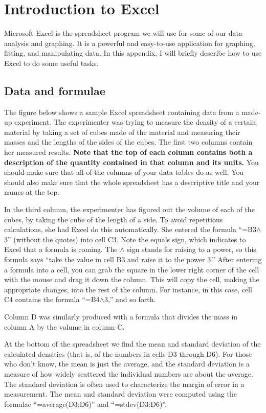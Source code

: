 \chapter{Introduction to Excel}

\bigskip\bigskip

Microsoft Excel is the spreadsheet program we will use for some of our
data analysis and graphing.  It is a powerful and easy-to-use
application for graphing, fitting, and manipulating data. In this
appendix, I will briefly describe how to use Excel to do some useful
tasks.  

\section{Data and formulae}

The figure below shows a sample Excel spreadsheet containing data
from a made-up experiment.  The experimenter was trying to measure
the density of a certain material by taking a set of cubes
made of the material and measuring their masses and the lengths of
the sides of the cubes.  The first two columns contain her measured
results.  \textbf{Note that the top of each column contains both
a description of the quantity contained in that column and its units.}
You should make sure that all of the columns of your data tables do as well.
You should also make sure that the whole spreadsheet has a descriptive
title and your names at the top.

In the third column, the experimenter has figured out the volume
of each of the cubes, by taking the cube of the length of a side.
To avoid repetitious calculations, she had Excel do this automatically.
She entered the formula ``=B3$\wedge$3'' (without the quotes) into cell C3.
Note the equals sign, which indicates to Excel that a formula is coming.
The $\wedge$ sign stands for raising to a power, so this
formula says ``take the value in cell B3 and raise it to the power 3.''
After entering a formula
into a cell, you can grab the square in the lower right corner of the
cell with the mouse and drag it down the column.  This will copy
the cell, making the appropriate changes, into the rest of the column.
For instance, in this case, cell C4 contains the formula ``=B4$\wedge$3,''
and so forth.

Column D was similarly produced with a formula that divides the
mass in column A by the volume in column C.

At the bottom of the spreadsheet we find the mean and standard
deviation of the calculated densities (that is, of the numbers
in cells D3 through D6). For those who don't know, the mean
is just the average, and the 
standard deviation is a measure of how widely scattered the
individual numbers are about the average. The standard deviation
is often used to characterize the margin of error in a measurement.
 The mean and standard deviation were computed
using the formulae ``=average(D3:D6)'' and ``=stdev(D3:D6)''.


